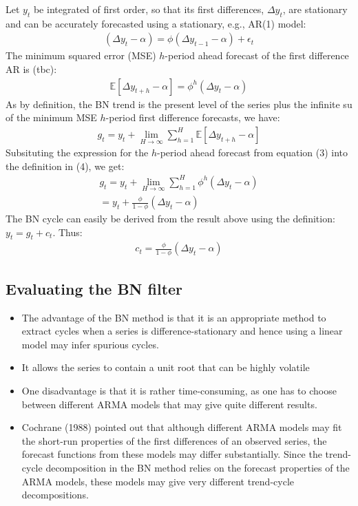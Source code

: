 \documentclass[10pt]{article}
\begin{document}
Let $y_t $ be integrated of first order, so that its first differences, $\Delta y_t $, are stationary and can be accurately forecasted using a stationary, e.g., AR(1) model: 
\begin{gather*}
    (\Delta y_t - \alpha) = \phi(\Delta y_{t - 1} - \alpha) + \epsilon_t
\end{gather*}
The minimum squared error (MSE) $h $-period ahead forecast of the first difference AR is (tbc):
\begin{gather}
    \mathbb{E}[\Delta y_{t + h} - \alpha] = \phi^h(\Delta y_t - \alpha)
\end{gather}
As by definition, the BN trend is the present level of the series plus the infinite su of the minimum MSE $h $-period first difference forecasts, we have:
\begin{gather}
    g_t = y_t + \lim_{H\to\infty}\sum_{h = 1}^{H}\mathbb{E}[\Delta y_{t + h} - \alpha]
\end{gather}
Subsituting the expression for the $h $-period ahead forecast from equation (3) into the definition in (4), we get: 
\begin{gather*}
    g_t = y_t + \lim_{H\to\infty}\sum_{h = 1}^{H}\phi^h(\Delta y_t - \alpha)\\
    = y_t + \frac{\phi}{1 - \phi}(\Delta y_t - \alpha)
\end{gather*}
The BN cycle can easily be derived from the result above using the definition: $y_t = g_t + c_t $. Thus: 
\begin{gather*}
    c_t = \frac{\phi}{1 - \phi}(\Delta y_t - \alpha)
\end{gather*}
\subsection{Evaluating the BN filter}
\begin{itemize}
    \item The advantage of the BN method is that it is an appropriate method to extract cycles when a series is difference-stationary and hence using a linear model may infer spurious cycles. 
    \item It allows the series to contain a unit root that can be highly volatile 
    \item One disadvantage is that it is rather time-consuming, as one has to choose between different ARMA models that may give quite different results. 
    \item Cochrane (1988) pointed out that although different ARMA models may fit the short-run properties of the first differences of an observed series, the forecast functions from these models may differ substantially. Since the trend-cycle decomposition in the BN method relies on the forecast properties of the ARMA models, these models may give very different trend-cycle decompositions. 
\end{itemize}
\newpage 
\end{document}
